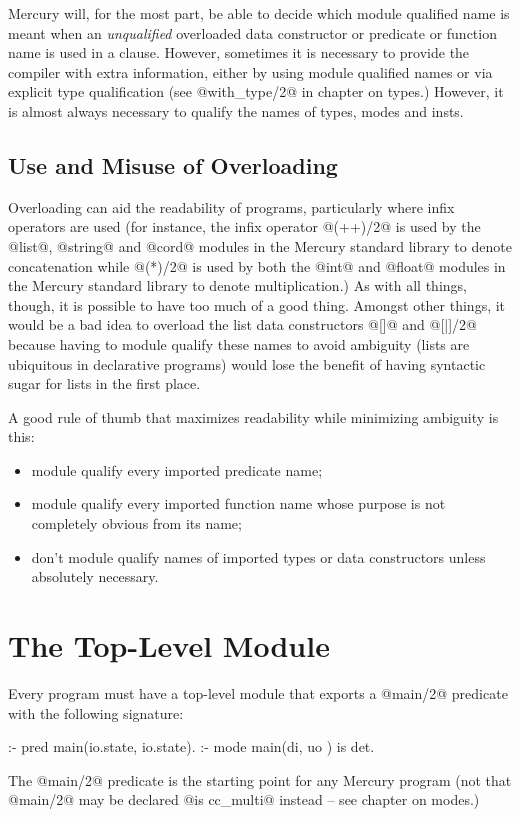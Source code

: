 Mercury will, for the most part, be able to decide which module
qualified name is meant when an \emph{unqualified} overloaded data constructor
or predicate or function name is used in a clause.  However, sometimes
it is necessary to provide the compiler with extra information, either
by using module qualified names or via explicit type qualification (see
@with_type/2@ in chapter \XXX{} on types.)  However, it is almost always
necessary to qualify the names of types, modes and insts.

\subsection{Use and Misuse of Overloading}

Overloading can aid the readability of programs, particularly where
infix operators are used (for instance, the infix operator @(++)/2@ is
used by the @list@, @string@ and @cord@ modules in the Mercury standard
library to denote concatenation while @(*)/2@ is used by both the @int@
and @float@ modules in the Mercury standard library to denote
multiplication.)
As with all things, though, it is
possible to have too much of a good thing.  Amongst other things, it
would be a bad idea to overload the list data constructors @[]@ and
@[|]/2@ because having to module qualify these names to avoid ambiguity
(lists are ubiquitous in declarative programs) would lose the benefit of
having syntactic sugar for lists in the first place.

A good rule of thumb that maximizes readability while minimizing
ambiguity is this:
\begin{itemize}
\item module qualify every imported predicate name;
\item module qualify every imported function name whose purpose is not
completely obvious from its name;
\item don't module qualify names of imported types or data constructors
unless absolutely necessary.
\end{itemize}

\section{The Top-Level Module}

Every program must have a top-level module that exports a @main/2@
predicate with the following signature:
\begin{myverbatim}
:- pred main(io.state, io.state).
:- mode main(di,       uo      ) is det.
\end{myverbatim}
The @main/2@ predicate is the starting point for any Mercury program
(not that @main/2@ may be declared @is cc_multi@ instead -- see chapter
\XXX{} on modes.)

